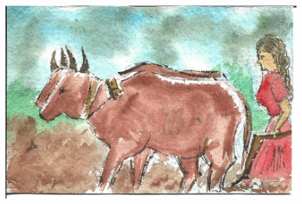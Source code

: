 \documentclass[12pt]{article}
\begin{document}
\newpage

\begin{figure}[h!]
\centering
\includegraphics[width=.7\paperwidth]{pictures/AP}
\end{figure}

\newpage
\end{document}
